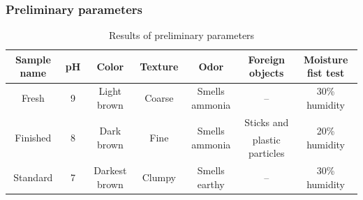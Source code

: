 \documentclass{article}
\begin{document}
\subsubsection{Preliminary parameters}
\renewcommand{\arraystretch}{1.5}
\begin{table}[ht!]
    \centering \vspace{.3cm}
    \caption{Results of preliminary parameters}
    \begin{tabular}{|c|c|c|c|c|c|c|}
        \hline
        \textbf{Sample name} & \textbf{pH} & \textbf{Color} & \textbf{Texture} & \textbf{Odor} & \textbf{Foreign objects} & \textbf{Moisture fist test}\\
        \hline
        Fresh & 9 & Light brown & Coarse & Smells ammonia & -- & 30\% humidity\\
        \hline                                                                   
        \multirow{2}{*}{Finished} & \multirow{2}{*}{8} & \multirow{2}{*}{Dark brown} & \multirow{2}{*}{Fine} & \multirow{2}{*}{Smells ammonia} & Sticks and & \multirow{2}{*}{20\% humidity} \\
                                  &   &            &      &                & plastic particles & \\
        \hline
        Standard & 7 & Darkest brown & Clumpy & Smells earthy & -- & 30\% humidity\\
        \hline
    \end{tabular}
\end{table}
\end{document}

